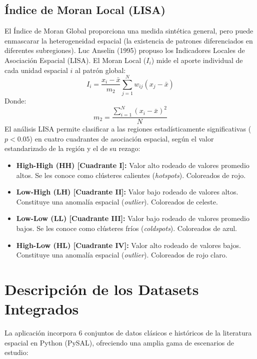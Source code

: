 \documentclass[a4paper,12pt]{article}
\begin{document}
\subsection{Índice de Moran Local (LISA)}
El Índice de Moran Global proporciona una medida sintética general, pero puede enmascarar la heterogeneidad espacial (la existencia de patrones diferenciados en diferentes subregiones). Luc Anselin (1995) propuso los Indicadores Locales de Asociación Espacial (LISA). El Moran Local ($I_i$) mide el aporte individual de cada unidad espacial $i$ al patrón global:
\[
I_i = \frac{x_i - \bar{x}}{m_2} \sum_{j=1}^N w_{ij}(x_j - \bar{x})
\]
Donde:
\[
m_2 = \frac{\sum_{i=1}^N (x_i - \bar{x})^2}{N}
\]
El análisis LISA permite clasificar a las regiones estadísticamente significativas ($p < 0.05$) en cuatro cuadrantes de asociación espacial, según el valor estandarizado de la región y el de su rezago:
\begin{itemize}
    \item \textbf{High-High (HH) [Cuadrante I]:} Valor alto rodeado de valores promedio altos. Se les conoce como clústeres calientes (\textit{hotspots}). Coloreados de rojo.
    \item \textbf{Low-High (LH) [Cuadrante II]:} Valor bajo rodeado de valores altos. Constituye una anomalía espacial (\textit{outlier}). Coloreados de celeste.
    \item \textbf{Low-Low (LL) [Cuadrante III]:} Valor bajo rodeado de valores promedio bajos. Se les conoce como clústeres fríos (\textit{coldspots}). Coloreados de azul.
    \item \textbf{High-Low (HL) [Cuadrante IV]:} Valor alto rodeado de valores bajos. Constituye una anomalía espacial (\textit{outlier}). Coloreados de rojo claro.
\end{itemize}

\newpage

\section{Descripción de los Datasets Integrados}

La aplicación incorpora 6 conjuntos de datos clásicos e históricos de la literatura espacial en Python (PySAL), ofreciendo una amplia gama de escenarios de estudio:
\end{document}
